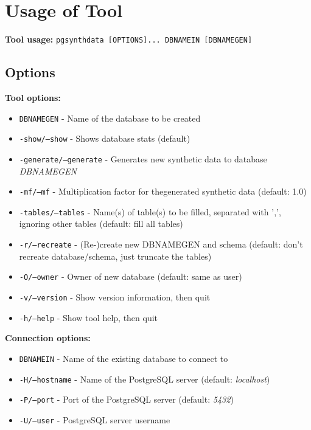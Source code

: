 \chapter{Usage of Tool}
\label{a:tool_usage}
\textbf{Tool usage:} \newline
\texttt{pgsynthdata [OPTIONS]... DBNAMEIN [DBNAMEGEN]} \\
\newline
\section{Options}
\textbf{Tool options:}
\begin{itemize}
	\item \texttt{DBNAMEGEN} - Name of the database to be created
	\item \texttt{-show/--show} - Shows database stats (default)
	\item \texttt{-generate/--generate} - Generates new synthetic data to database \textit{DBNAMEGEN}
	\item \texttt{-mf/--mf} - Multiplication factor for thegenerated synthetic data (default: 1.0)
	\item \texttt{-tables/--tables} - Name(s) of table(s) to be filled, separated with ',', ignoring other tables (default: fill all tables)
	\item \texttt{-r/--recreate} - (Re-)create new DBNAMEGEN and schema (default: don't recreate database/schema, just truncate the tables)
	\item \texttt{-O/--owner} - Owner of new database (default: same as user)
	\item \texttt{-v/--version} - Show version information, then quit
	\item \texttt{-h/--help} - Show tool help, then quit
	\newline
\end{itemize}
\textbf{Connection options:}
\begin{itemize}
	\item \texttt{DBNAMEIN} - Name of the existing database to connect to
	\item \texttt{-H/--hostname} - Name of the PostgreSQL server (default: \textit{localhost})
	\item \texttt{-P/--port} - Port of the PostgreSQL server (default: \textit{5432})
	\item \texttt{-U/--user} - PostgreSQL server username
	\newline
\end{itemize}
